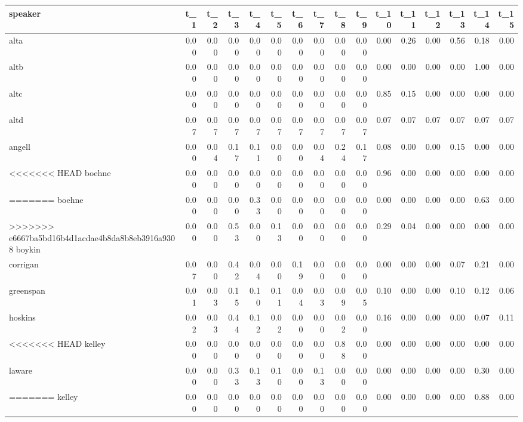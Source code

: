 \begin{tabular}{lrrrrrrrrrrrrrrr}
\toprule
   speaker &  t\_1 &  t\_2 &  t\_3 &  t\_4 &  t\_5 &  t\_6 &  t\_7 &  t\_8 &  t\_9 &  t\_10 &  t\_11 &  t\_12 &  t\_13 &  t\_14 &  t\_15 \\
\midrule
      alta & 0.00 & 0.00 & 0.00 & 0.00 & 0.00 & 0.00 & 0.00 & 0.00 & 0.00 &  0.00 &  0.26 &  0.00 &  0.56 &  0.18 &  0.00 \\
      altb & 0.00 & 0.00 & 0.00 & 0.00 & 0.00 & 0.00 & 0.00 & 0.00 & 0.00 &  0.00 &  0.00 &  0.00 &  0.00 &  1.00 &  0.00 \\
      altc & 0.00 & 0.00 & 0.00 & 0.00 & 0.00 & 0.00 & 0.00 & 0.00 & 0.00 &  0.85 &  0.15 &  0.00 &  0.00 &  0.00 &  0.00 \\
      altd & 0.07 & 0.07 & 0.07 & 0.07 & 0.07 & 0.07 & 0.07 & 0.07 & 0.07 &  0.07 &  0.07 &  0.07 &  0.07 &  0.07 &  0.07 \\
    angell & 0.00 & 0.04 & 0.17 & 0.11 & 0.00 & 0.00 & 0.04 & 0.24 & 0.17 &  0.08 &  0.00 &  0.00 &  0.15 &  0.00 &  0.00 \\
<<<<<<< HEAD
    boehne & 0.00 & 0.00 & 0.00 & 0.00 & 0.00 & 0.00 & 0.00 & 0.00 & 0.00 &  0.96 &  0.00 &  0.00 &  0.00 &  0.00 &  0.00 \\
=======
    boehne & 0.00 & 0.00 & 0.00 & 0.33 & 0.00 & 0.00 & 0.00 & 0.00 & 0.00 &  0.00 &  0.00 &  0.00 &  0.00 &  0.63 &  0.00 \\
>>>>>>> e6667ba5bd16b4d1acdae4b8da8b8eb3916a9308
    boykin & 0.00 & 0.00 & 0.53 & 0.00 & 0.13 & 0.00 & 0.00 & 0.00 & 0.00 &  0.29 &  0.04 &  0.00 &  0.00 &  0.00 &  0.00 \\
  corrigan & 0.07 & 0.00 & 0.42 & 0.04 & 0.00 & 0.19 & 0.00 & 0.00 & 0.00 &  0.00 &  0.00 &  0.00 &  0.07 &  0.21 &  0.00 \\
 greenspan & 0.01 & 0.03 & 0.15 & 0.10 & 0.11 & 0.04 & 0.03 & 0.09 & 0.05 &  0.10 &  0.00 &  0.00 &  0.10 &  0.12 &  0.06 \\
   hoskins & 0.02 & 0.03 & 0.44 & 0.12 & 0.02 & 0.00 & 0.00 & 0.02 & 0.00 &  0.16 &  0.00 &  0.00 &  0.00 &  0.07 &  0.11 \\
<<<<<<< HEAD
    kelley & 0.00 & 0.00 & 0.00 & 0.00 & 0.00 & 0.00 & 0.00 & 0.88 & 0.00 &  0.00 &  0.00 &  0.00 &  0.00 &  0.00 &  0.00 \\
    laware & 0.00 & 0.00 & 0.33 & 0.13 & 0.10 & 0.00 & 0.13 & 0.00 & 0.00 &  0.00 &  0.00 &  0.00 &  0.00 &  0.30 &  0.00 \\
=======
    kelley & 0.00 & 0.00 & 0.00 & 0.00 & 0.00 & 0.00 & 0.00 & 0.00 & 0.00 &  0.00 &  0.00 &  0.00 &  0.00 &  0.88 &  0.00 \\

\end{tabular}
